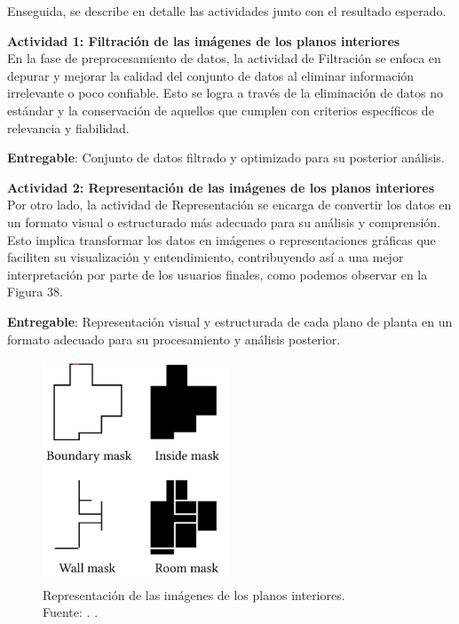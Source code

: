 Enseguida, se describe en detalle las actividades junto con el resultado esperado.

\textbf{Actividad 1: Filtración de las imágenes de los planos interiores}
\\
En la fase de preprocesamiento de datos, la actividad de Filtración se enfoca en depurar y mejorar la calidad del conjunto de datos al eliminar información irrelevante o poco confiable. Esto se logra a través de la eliminación de datos no estándar y la conservación de aquellos que cumplen con criterios específicos de relevancia y fiabilidad. 

\textbf{Entregable}: Conjunto de datos filtrado y optimizado para su posterior análisis.

\textbf{Actividad 2: Representación de las imágenes de los planos interiores}
\\
Por otro lado, la actividad de Representación se encarga de convertir los datos en un formato visual o estructurado más adecuado para su análisis y comprensión. Esto implica transformar los datos en imágenes o representaciones gráficas que faciliten su visualización y entendimiento, contribuyendo así a una mejor interpretación por parte de los usuarios finales, como podemos observar en la Figura 38.

\textbf{Entregable}: Representación visual y estructurada de cada plano de planta en un formato adecuado para su procesamiento y análisis posterior.

\begin{figure}[h]
    \begin{center}
        \includegraphics[width=0.5\textwidth]{3/figures/Representacion_planos.jpg}
        \caption[Representación de las imágenes de los planos interiores]{Representación de las imágenes de los planos interiores.\\
        Fuente: \cite{art_wu2019interior}. .}
        \label{3:fig3}
    \end{center}
\end{figure}

